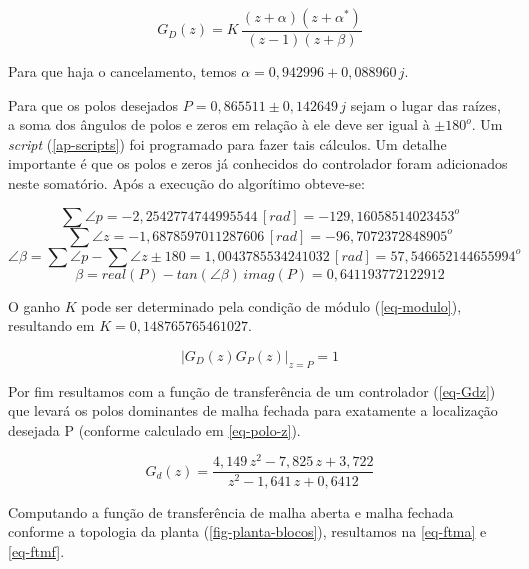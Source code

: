 \documentclass[
	12pt,				%
	article,			%
	openright,			%
	oneside,
	a4paper,			%
	chapter=TITLE,		%
	section=TITLE,		%
	english,			%
	french,				%
	spanish,			%
	brazil,				%
]{abntex2}
\begin{document}
            	\begin{equation}
            	    \label{eq-controlador}
            	    G_D(z) = K\,\frac{(z+\alpha)(z+\alpha^*)}{(z-1)(z+\beta)}
            	\end{equation}
            	
            	Para que haja o cancelamento, temos $\alpha = 0,942996 +0,088960\,j$.
            	
            	Para que os polos desejados $ P=0,865511 \pm 0,142649\,j $ sejam o lugar das raízes, a soma dos ângulos de polos e zeros em relação à ele deve ser igual à $\pm 180^o$. Um \textit{script} (\autoref{ap-scripts}) foi programado para fazer tais cálculos. Um detalhe importante é que os polos e zeros já conhecidos do controlador foram adicionados neste somatório. Após a execução do algorítimo obteve-se:
            	
            	$$ \sum{\angle{p}} = -2,2542774744995544\,[rad] = -129,16058514023453^o$$
                $$ \sum{\angle{z}} = -1,6878597011287606\,[rad] = -96,7072372848905^o$$
                $$ \angle{\beta} = \sum{\angle{p}} -\sum{\angle{z}} \pm180 = 1,0043785534241032\,[rad] = 57,546652144655994^o $$
                $$\beta = real(P) -tan(\angle{\beta})\,imag(P) = 0,641193772122912$$
            	
            	O ganho $K$ pode ser determinado pela condição de módulo (\autoref{eq-modulo}), resultando em $K = 0,148765765461027$.
            
                \begin{equation}
                    \label{eq-modulo}
                    |G_D(z) G_P(z)|_{z = P} = 1
                \end{equation}
                
                Por fim resultamos com a função de transferência de um controlador (\autoref{eq-Gdz}) que levará os polos dominantes de malha fechada para exatamente a localização desejada P (conforme calculado em \autoref{eq-polo-z}).
                
                \begin{equation}
                    \label{eq-Gdz}
                    G_d(z) = \frac{4,149\,z^2 -7,825\,z +3,722}{z^2 -1,641\,z +0,6412}
                \end{equation}
                
                Computando a função de transferência de malha aberta e malha fechada conforme a topologia da planta (\autoref{fig-planta-blocos}), resultamos na \autoref{eq-ftma} e \autoref{eq-ftmf}.
                
\end{document}
